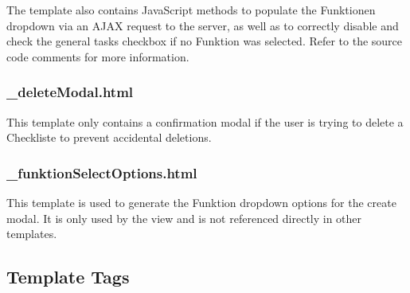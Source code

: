 \documentclass[letterpaper,10pt,english]{sphinxmanual}
\begin{document}
The template also contains JavaScript methods to populate the Funktionen dropdown via an AJAX request to the server, as well as to correctly disable and check the general tasks checkbox if no Funktion was selected. Refer to the source code comments for more information.


\subsubsection{\_deleteModal.html}
\label{\detokenize{masterCodeDoc:deletemodal-html}}
This template only contains a confirmation modal if the user is trying to delete a Checkliste to prevent accidental deletions.


\subsubsection{\_funktionSelectOptions.html}
\label{\detokenize{masterCodeDoc:funktionselectoptions-html}}
This template is used to generate the Funktion dropdown options for the create modal. It is only used by the  view and is not referenced directly in other templates.


\subsection{Template Tags}
\label{\detokenize{masterCodeDoc:id13}}\label{\detokenize{masterCodeDoc:module-checklisten.templatetags.t_checklisten.get_perms}}
\end{document}
